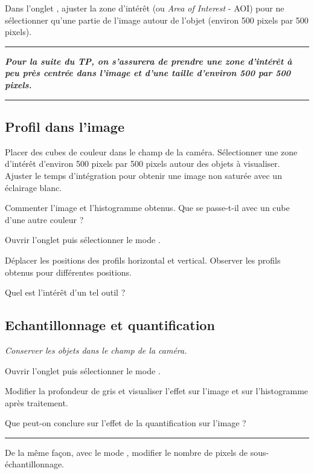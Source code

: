 \Manip Dans l'onglet , ajuster la zone d'intérêt (ou \textit{Area of Interest} - AOI) pour ne sélectionner qu'une partie de l'image autour de l'objet (environ 500 pixels par 500 pixels).

\noindent \rule{\linewidth}{1pt}

\textit{\textbf{Pour la suite du TP, on s'assurera de prendre une zone d'intérêt à peu près centrée dans l'image et d'une taille d'environ 500 par 500 pixels.}}

\noindent \rule{\linewidth}{1pt}

\subsection{Profil dans l'image}

\Manip Placer des cubes de couleur dans le champ de la caméra. Sélectionner une zone d'intérêt d'environ 500 pixels par 500 pixels autour des objets à visualiser. Ajuster le temps d'intégration pour obtenir une image non saturée avec un éclairage blanc. 

\Quest Commenter l'image et l'histogramme obtenus. Que se passe-t-il avec un cube d'une autre couleur ?

\Manip Ouvrir l'onglet  puis sélectionner le mode .

\Manip Déplacer les positions des profils horizontal et vertical. Observer les profils obtenus pour différentes positions.

\Quest Quel est l'intérêt d'un tel outil ?


\subsection{Echantillonnage et quantification}

\textit{Conserver les objets dans le champ de la caméra.}

\Manip Ouvrir l'onglet  puis sélectionner le mode .

\Manip Modifier la profondeur de gris et visualiser l'effet sur l'image et sur l'histogramme après traitement.

\Quest Que peut-on conclure sur l'effet de la quantification sur l'image ?

\noindent \rule{\linewidth}{1pt}

\Manip De la même façon, avec le mode , modifier le nombre de pixels de sous-échantillonnage. 

